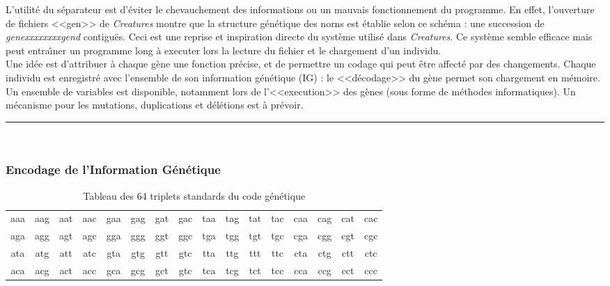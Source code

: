 \documentclass[11pt,twoside,a4paper]{article}
\begin{document}
L'utilit{\'e} du s{\'e}parateur est d'{\'e}viter le chevauchement des informations ou un mauvais fonctionnement du programme. En effet, l'ouverture de fichiers <<gen>> de \textit{Creatures} montre que la structure g{\'e}n{\'e}tique des norns est {\'e}tablie selon ce sch{\'e}ma : une succession de \emph{genexxxxxxxxgend} contigu{\" e}s. Ceci est une reprise et inspiration directe du syst{\`e}me utilis{\'e} dans \textit{Creatures}. Ce syst{\`e}me semble efficace mais peut entra{\^\i}ner un programme long {\`a} executer lors la lecture du fichier et le chargement d'un individu.~\\

Une id{\'e}e est d'attribuer {\`a} chaque g{\`e}ne une fonction pr{\'e}cise, et de permettre un codage qui peut {\^e}tre affect{\'e} par des changements. Chaque individu est enregistr{\'e} avec l'ensemble de son information g{\'e}n{\'e}tique (IG) : le <<d{\'e}codage>> du g{\`e}ne permet son chargement en m{\'e}moire.  Un ensemble de variables est disponible, notamment lors de l'<<execution>> des g{\`e}nes (sous forme de m{\'e}thodes informatiques). Un m{\'e}canisme pour les mutations, duplications et d{\'e}l{\'e}tions est {\`a} pr{\'e}voir.~\\

\rule{10cm}{0.5mm}~\\

\subsubsection{Encodage de l'Information G{\'e}n{\'e}tique}

\begin{table}[ht]
	\begin{center}
		\begin{tabular}{|c c c c c c c c c c c c c c c c|}
		\hline
			aaa&aag&aat&aac&gaa&gag&gat&gac&taa&tag&tat&tac&caa&cag&cat&cac\\
			aga&agg&agt&agc&gga&ggg&ggt&ggc&tga&tgg&tgt&tgc&cga&cgg&cgt&cgc\\
			ata&atg&att&atc&gta&gtg&gtt&gtc&tta&ttg&ttt&ttc&cta&ctg&ctt&ctc\\
			aca&acg&act&acc&gca&gcg&gct&gtc&tca&tcg&tct&tcc&cca&ccg&cct&ccc\\
		\hline
		\end{tabular}
	\end{center}
	\caption{Tableau des 64 triplets standards du code g{\'e}n{\'e}tique}
	\label{tab:InformationGenetiqueStandardTriplets}
\end{table}
\end{document}
